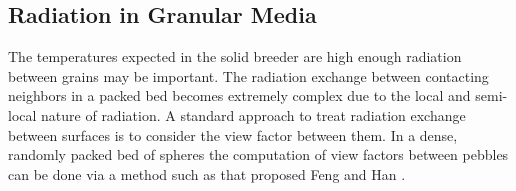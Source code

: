 






\subsection{Radiation in Granular Media}

The temperatures expected in the solid breeder are high enough radiation between grains may be important. The radiation exchange between contacting neighbors in a packed bed becomes extremely complex due to the local and semi-local nature of radiation. A standard approach to treat radiation exchange between surfaces is to consider the view factor between them. In a dense, randomly packed bed of spheres the computation of view factors between pebbles can be done via a method such as that proposed Feng and Han \cite{Feng2012}. 

